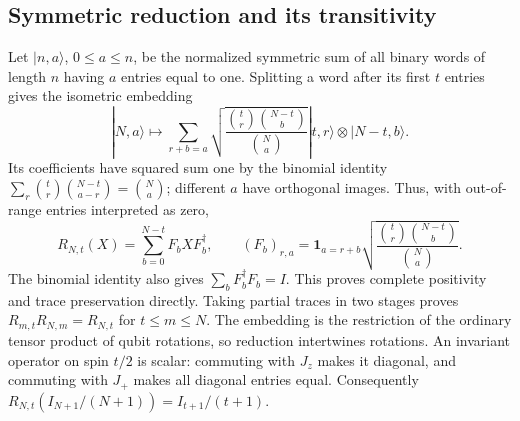 \documentclass[11pt,a4paper]{article}
\begin{document}
\subsection{Symmetric reduction and its transitivity}
Let $|n,a\rangle$, $0\le a\le n$, be the normalized symmetric sum of all
binary words of length $n$ having $a$ entries equal to one. Splitting a
word after its first $t$ entries gives the isometric embedding
\[
 |N,a\rangle\longmapsto
 \sum_{r+b=a}\sqrt{\frac{\binom tr\binom{N-t}b}{\binom Na}}
 |t,r\rangle\otimes|N-t,b\rangle.
\]
Its coefficients have squared sum one by the binomial identity
$\sum_r\binom tr\binom{N-t}{a-r}=\binom Na$; different $a$ have
orthogonal images. Thus, with out-of-range entries interpreted as zero,
\begin{equation}\label{eq:reduction-kraus}
 R_{N,t}(X)=\sum_{b=0}^{N-t}F_bXF_b^\dagger,
 \qquad (F_b)_{r,a}=\mathbf1_{a=r+b}
 \sqrt{\frac{\binom tr\binom{N-t}b}{\binom Na}}.
\end{equation}
The binomial identity also gives $\sum_bF_b^\dagger F_b=I$.
This proves complete positivity and trace preservation directly.
Taking partial traces in two stages proves
$R_{m,t}R_{N,m}=R_{N,t}$ for $t\le m\le N$.
The embedding is the restriction of the ordinary tensor product of
qubit rotations, so reduction intertwines rotations. An invariant
operator on spin $t/2$ is scalar: commuting with $J_z$ makes it diagonal,
and commuting with $J_+$ makes all diagonal entries equal.
Consequently $R_{N,t}(I_{N+1}/(N+1))=I_{t+1}/(t+1)$.
\end{document}
